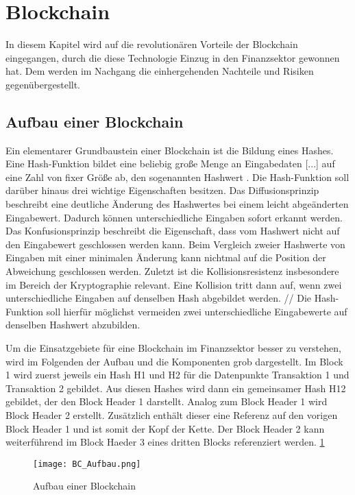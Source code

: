 \section{Blockchain}
In diesem Kapitel wird auf die revolutionären Vorteile der Blockchain 
eingegangen, durch die diese Technologie Einzug in den Finanzsektor gewonnen 
hat. Dem werden im Nachgang die einhergehenden Nachteile und Risiken gegenübergestellt. 

\subsection{Aufbau einer Blockchain}
Ein elementarer Grundbaustein einer Blockchain ist die Bildung eines Hashes.
\glqq Eine Hash-Funktion bildet eine beliebig große Menge an Eingabedaten [...] auf eine Zahl von 
fixer Größe ab, den sogenannten Hashwert\grqq{} \cite[p.~6]{fill2020blockchain}.
Die Hash-Funktion soll darüber hinaus drei wichtige Eigenschaften besitzen.
Das Diffusionsprinzip beschreibt eine deutliche Änderung des Hashwertes bei einem leicht
abgeänderten Eingabewert. Dadurch können unterschiedliche Eingaben sofort erkannt werden.
Das Konfusionsprinzip beschreibt die Eigenschaft, dass vom Hashwert nicht auf den Eingabewert
geschlossen werden kann. Beim Vergleich zweier Hashwerte von Eingaben mit einer minimalen
Änderung kann nichtmal auf die Position der Abweichung geschlossen werden.
Zuletzt ist die Kollisionsresistenz insbesondere im Bereich der Kryptographie relevant.
Eine Kollision tritt dann auf, wenn zwei unterschiedliche Eingaben auf denselben Hash abgebildet
werden. // Die Hash-Funktion soll hierfür möglichst vermeiden zwei unterschiedliche Eingabewerte
auf denselben Hashwert abzubilden.
\cite[p.~6ff]{fill2020blockchain} 

Um die Einsatzgebiete für eine Blockchain im Finanzsektor besser zu verstehen,
wird im Folgenden der Aufbau und die Komponenten grob dargestellt.
Im Block 1 wird zuerst jeweils ein Hash H1 und H2 für die Datenpunkte Transaktion 1 
und Transaktion 2 gebildet. Aus diesen Hashes wird dann ein gemeinsamer Hash H12 gebildet, 
der den Block Header 1 darstellt.
Analog zum Block Header 1 wird Block Header 2 erstellt. Zusätzlich enthält dieser eine
Referenz auf den vorigen Block Header 1 und ist somit der Kopf der Kette. Der Block Header 2
kann weiterführend im Block Haeder 3 eines dritten Blocks referenziert werden. 
\ref{fig:BC_Aufbau}
\cite[p.~17f]{fill2020blockchain}

\begin{figure}[h!]
    \texttt{[image: BC\_Aufbau.png]}
    \caption{Aufbau einer Blockchain \cite[p.~19]{fill2020blockchain}}
    \label{fig:BC_Aufbau}
\end{figure}


